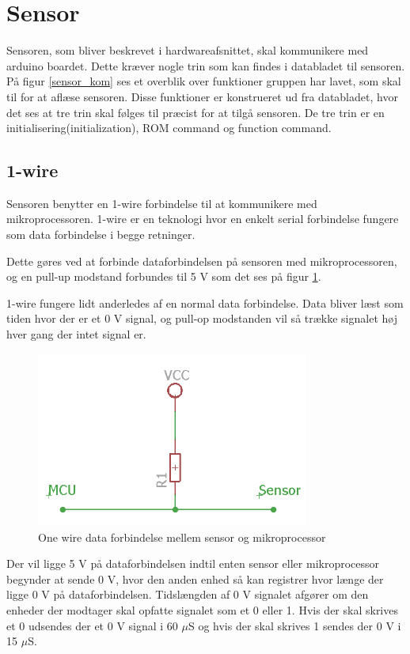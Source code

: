 \section{Sensor}
Sensoren, som bliver beskrevet i hardwareafsnittet, skal kommunikere med arduino boardet. Dette kræver nogle trin som kan findes i databladet til sensoren. På figur \ref{sensor_kom} ses et overblik over funktioner gruppen har lavet, som skal til for at aflæse sensoren. Disse funktioner er konstrueret ud fra databladet, hvor det ses at tre trin skal følges til præcist for at tilgå sensoren. De tre trin er en initialisering(initialization), ROM command og function command.
\subsection{1-wire}
Sensoren benytter en 1-wire forbindelse til at kommunikere med mikroprocessoren. 1-wire er en teknologi hvor en  enkelt serial forbindelse fungere som data forbindelse i begge retninger. 

Dette gøres ved at forbinde dataforbindelsen på sensoren med mikroprocessoren, og en pull-up modstand forbundes til 5 V som det ses på figur \ref{one_wire_schematic}. 

1-wire fungere lidt anderledes af en normal data forbindelse. Data bliver læst som tiden hvor der er et 0 V signal, og pull-op modstanden vil så trække signalet høj hver gang der intet signal er.

\begin{figure}[h!]
  \centering
  \includegraphics[width=0.8\textwidth]{figures/onewire_eksempel.png}
  \caption{One wire data forbindelse mellem sensor og mikroprocessor}
  \label{one_wire_schematic}
\end{figure}

Der vil ligge 5 V på dataforbindelsen indtil enten sensor eller mikroprocessor begynder at sende 0 V, hvor den anden enhed så kan registrer hvor længe der ligge 0 V på dataforbindelsen. Tidslængden af 0 V signalet afgører om den enheder der modtager skal opfatte signalet som et 0 eller 1. Hvis der skal skrives et 0 udsendes der et 0 V signal i 60 $\mu$S og hvis der skal skrives 1 sendes der 0 V i 15 $\mu$S. 

